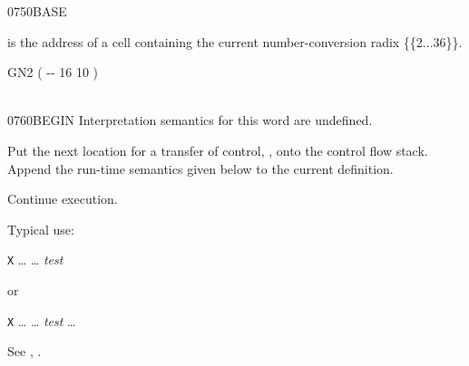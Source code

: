 \vspace*{-2.5ex}
\begin{worddef}{0750}{BASE}
\item {}

	 is the address of a cell containing the current
	number-conversion radix \{\{2...36\}\}.

	\begin{testing} %
		\ttfamily
		\word{:} GN2	 ( -{}- 16 10 ) \\
		\tab {}  
			  
			  
			  \word{!} \word{;} \\
	\end{testing}
\end{worddef}

\vspace*{-2.5ex}
\begin{worddef}{0760}{BEGIN}
\interpret
	Interpretation semantics for this word are undefined.

\compile

	Put the next location for a transfer of control, , onto
	the control flow stack. Append the run-time semantics given below
	to the current definition.

\runtime
	\stack{}{}

	Continue execution.


	\begin{rationale} %
		Typical use:

		\tab \word{:} \texttt{X} {\ldots}
			 {\ldots} \emph{test} 
		\word{;}

		or

		\tab \word{:} \texttt{X} {\ldots}
			 {\ldots}
			\emph{test}  {\ldots}
		\word{;}
	\end{rationale}

	\begin{testing} %
		See ,
			.
	\end{testing}
\end{worddef}


